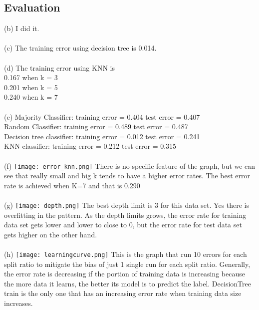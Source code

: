 \documentclass[12pt]{article}
\begin{document}
    \subsection{Evaluation}
        (b) I did it.\\\\
        (c) The training error using decision tree is 0.014.\\\\
        (d) The training error using KNN is \\  
            \hspace*{5mm} 0.167 when k = 3\\
            \hspace*{5mm} 0.201 when k = 5\\
            \hspace*{5mm} 0.240 when k = 7\\
        \\
        (e) Majority Classifier: training error = 0.404  \hspace{5mm} test error = 0.407\\
            \hspace*{5mm} Random Classifier: training error = 0.489   \hspace{5mm} test error = 0.487\\
            \hspace*{5mm} Decision tree classifier: training error = 0.012 
                    \hspace{5mm} test error = 0.241 \\ 
            \hspace*{5mm} KNN classifier: training error = 0.212 \hspace{5mm} test error = 0.315\\
        \\
        (f) 
            \texttt{[image: error\_knn.png]}
            There is no specific feature of the graph, but we can see that really small and big k tends to have a higher error rates. The best error rate is achieved when K=7 and that is 0.290\\\\
        (g)
            \texttt{[image: depth.png]}
            The best depth limit is 3 for this data set. Yes there is overfitting in the pattern. As the depth limits grows, the error rate for training data set gets lower and lower to close to 0, but the error rate for test data set gets higher on the other hand.\\\\
        
        (h)
            \texttt{[image: learningcurve.png]}
            This is the graph that run 10 errors for each split ratio to mitigate the bias of just 1 single run for each split ratio. Generally, the error rate is decreasing if the portion of training data is increasing because the more data it learns, the better its model is to predict the label. DecisionTree train is the only one that has an increasing error rate when training data size increases.
\end{document}
